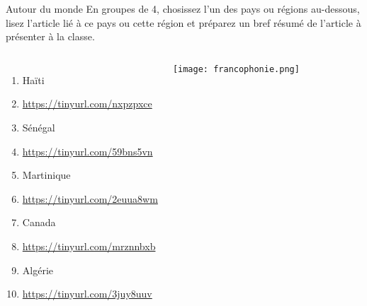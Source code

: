 \begin{frame}{Autour du monde}
  \footnotesize
  En groupes de 4, chosissez l'un des pays ou régions au-dessous, lisez l'article lié à ce pays ou cette région et préparez un bref résumé  de l'article à présenter à la classe.
  \begin{columns}
      \begin{enumerate}
        \item Haïti
          \item[] \href{https://tinyurl.com/nxpzpxce}{https://tinyurl.com/nxpzpxce}
        \item Sénégal
          \item[] \href{https://tinyurl.com/59bns5vn}{https://tinyurl.com/59bns5vn}
        \item Martinique
          \item[] \href{https://tinyurl.com/2euua8wm}{https://tinyurl.com/2euua8wm}
        \item Canada
          \item[] \href{https://tinyurl.com/mrznnbxb}{https://tinyurl.com/mrznnbxb}
        \item Algérie
          \item[] \href{https://tinyurl.com/3juy8uuv}{https://tinyurl.com/3juy8uuv}
      \end{enumerate}
      \begin{center}
        \texttt{[image: francophonie.png]}
      \end{center}
  \end{columns}
\end{frame}